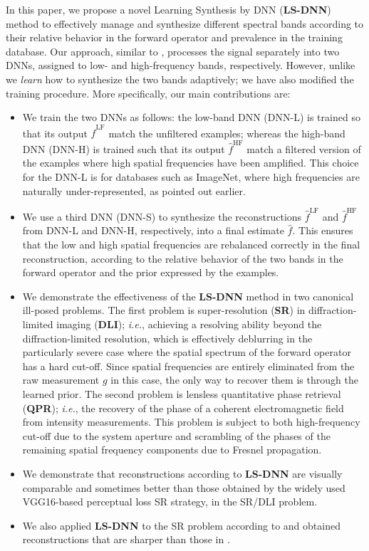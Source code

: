 \documentclass[10pt,twocolumn,letterpaper]{article}
\newcommand{\flf}{\hat{f}^{\text{LF}}}
\newcommand{\fhf}{\hat{f}^{\text{HF}}}
\begin{document}
In this paper, we propose a novel Learning Synthesis by DNN (\textbf{LS-DNN}) method to effectively manage and synthesize different spectral bands according to their relative behavior in the forward operator and prevalence in the training database. Our approach, similar to \cite{Pan_2018_CVPR}, processes the signal separately into two DNNs, assigned to low- and high-frequency bands, respectively. However, unlike \cite{Pan_2018_CVPR} we {\em learn} how to synthesize the two bands adaptively; we have also modified the training procedure. More specifically, our main contributions are:
\begin{itemize}
    \item We train the two DNNs as follows: the low-band DNN (DNN-L) is trained so that its output $\flf$ match the unfiltered examples; whereas the high-band DNN (DNN-H) is trained such that its output $\fhf$ match a filtered version of the examples where high spatial frequencies have been amplified. This choice for the DNN-L is for databases such as ImageNet, where high frequencies are naturally under-represented, as pointed out earlier. 
    
    \item We use a third DNN (DNN-S) to synthesize the reconstructions $\flf$ and $\fhf$ from DNN-L and DNN-H, respectively, into a final estimate $\hat{f}$. This ensures that the low and high spatial frequencies are rebalanced correctly in the final reconstruction, according to the relative behavior of the two bands in the forward operator and the prior expressed by the examples. 
    
    \item We demonstrate the effectiveness of the \textbf{LS-DNN} method in two canonical ill-posed problems. The first problem is super-resolution (\textbf{SR}) in diffraction-limited imaging (\textbf{DLI}); {\it i.e.}, achieving a resolving ability beyond the diffraction-limited resolution, which is effectively deblurring in the particularly severe case where the spatial spectrum of the forward operator has a hard cut-off. Since spatial frequencies are entirely eliminated from the raw measurement $g$ in this case, the only way to recover them is through the learned prior. The second problem is lensless quantitative phase retrieval (\textbf{QPR}); {\it i.e.}, the recovery of the phase of a coherent electromagnetic field from intensity measurements. This problem is subject to both high-frequency cut-off due to the system aperture and scrambling of the phases of the remaining spatial frequency components due to Fresnel propagation. 
    
    \item We demonstrate that reconstructions according to \textbf{LS-DNN} are visually comparable and sometimes better than those obtained by the widely used VGG16\cite{simonyan2014very}-based perceptual loss\cite{johnson2016perceptual} SR strategy, in the SR/DLI problem. 
    
    \item We also applied {\bf LS-DNN} to the SR problem according to \cite{Pan_2018_CVPR} and obtained reconstructions that are sharper than those in \cite{Pan_2018_CVPR}. 
\end{itemize}
\end{document}
